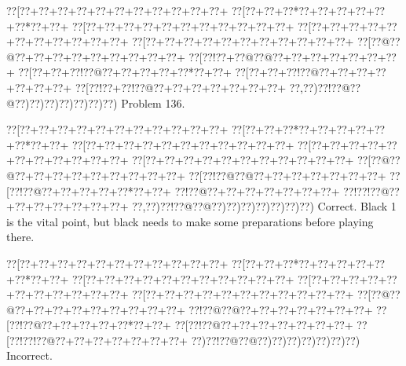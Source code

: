 \documentclass[a5paper]{article}
\begin{document}
\newpage
\begin{center}
{\goo
\0??[\0??+\0??+\0??+\0??+\0??+\0??+\0??+\0??+\0??+\0??+\0??+
\0??[\0??+\0??+\0??*\0??+\0??+\0??+\0??+\0??+\0??*\0??+\0??+
\0??[\0??+\0??+\0??+\0??+\0??+\0??+\0??+\0??+\0??+\0??+\0??+
\0??[\0??+\0??+\0??+\0??+\0??+\0??+\0??+\0??+\0??+\0??+\0??+
\0??[\0??+\0??+\0??+\0??+\0??+\0??+\0??+\0??+\0??+\0??+\0??+
\0??[\0??@\0??@\0??+\0??+\0??+\0??+\0??+\0??+\0??+\0??+\0??+
\0??[\0??!\0??+\0??@\0??@\0??+\0??+\0??+\0??+\0??+\0??+\0??+
\0??[\0??+\0??+\0??!\0??@\0??+\0??+\0??+\0??+\0??*\0??+\0??+
\0??[\0??+\0??+\0??!\0??@\0??+\0??+\0??+\0??+\0??+\0??+\0??+
\0??[\0??!\0??+\0??!\0??@\0??+\0??+\0??+\0??+\0??+\0??+\0??+
\0??,\0??)\0??!\0??@\0??@\0??)\0??)\0??)\0??)\0??)\0??)\0??)
}
Problem 136.

\end{center}
\begin{center}
{\goo
\0??[\0??+\0??+\0??+\0??+\0??+\0??+\0??+\0??+\0??+\0??+\0??+
\0??[\0??+\0??+\0??*\0??+\0??+\0??+\0??+\0??+\0??*\0??+\0??+
\0??[\0??+\0??+\0??+\0??+\0??+\0??+\0??+\0??+\0??+\0??+\0??+
\0??[\0??+\0??+\0??+\0??+\0??+\0??+\0??+\0??+\0??+\0??+\0??+
\0??[\0??+\0??+\0??+\0??+\0??+\0??+\0??+\0??+\0??+\0??+\0??+
\0??[\0??@\0??@\0??+\0??+\0??+\0??+\0??+\0??+\0??+\0??+\0??+
\0??[\0??!\0??@\0??@\0??+\0??+\0??+\0??+\0??+\0??+\0??+
\0??[\0??!\0??@\0??+\0??+\0??+\0??+\0??*\0??+\0??+
\0??!\0??@\0??+\0??+\0??+\0??+\0??+\0??+\0??+
\0??!\0??!\0??@\0??+\0??+\0??+\0??+\0??+\0??+\0??+
\0??,\0??)\0??!\0??@\0??@\0??)\0??)\0??)\0??)\0??)\0??)\0??)
}
Correct. Black 1 is the vital point, but black needs to make some preparations before playing there.

\end{center}
\begin{center}
{\goo
\0??[\0??+\0??+\0??+\0??+\0??+\0??+\0??+\0??+\0??+\0??+\0??+
\0??[\0??+\0??+\0??*\0??+\0??+\0??+\0??+\0??+\0??*\0??+\0??+
\0??[\0??+\0??+\0??+\0??+\0??+\0??+\0??+\0??+\0??+\0??+\0??+
\0??[\0??+\0??+\0??+\0??+\0??+\0??+\0??+\0??+\0??+\0??+\0??+
\0??[\0??+\0??+\0??+\0??+\0??+\0??+\0??+\0??+\0??+\0??+\0??+
\0??[\0??@\0??@\0??+\0??+\0??+\0??+\0??+\0??+\0??+\0??+\0??+
\0??!\0??@\0??@\0??+\0??+\0??+\0??+\0??+\0??+\0??+
\0??[\0??!\0??@\0??+\0??+\0??+\0??+\0??*\0??+\0??+
\0??[\0??!\0??@\0??+\0??+\0??+\0??+\0??+\0??+\0??+
\0??[\0??!\0??!\0??@\0??+\0??+\0??+\0??+\0??+\0??+\0??+
\0??)\0??!\0??@\0??@\0??)\0??)\0??)\0??)\0??)\0??)\0??)
}
Incorrect. 

\end{center}
\end{document}
